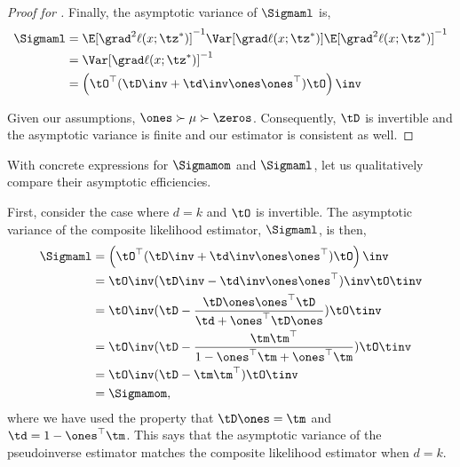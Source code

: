 \begin{proof}[Proof for ]
Finally, the asymptotic variance of $\Sigmaml$ is,
\begin{align*}
    \Sigmaml &= \E[\grad^2 \ell(x ; \tz^*)]^{-1} \Var[\grad \ell(x ; \tz^*)] \E[\grad^2 \ell(x ; \tz^*)]^{-1} \\
      &= \Var[\grad \ell(x;\tz^*)]^{-1} \\
      &= \left( \tO^\top(\tD\inv + \td\inv \ones \ones^\top) \tO \right)\inv
\end{align*}

Given our assumptions, $\ones \succ \mu \succ \zeros$. Consequently,
$\tD$ is invertible and the asymptotic variance is finite and our
estimator is consistent as well. 
\end{proof}

With concrete expressions for $\Sigmamom$ and $\Sigmaml$, let us
qualitatively compare their asymptotic efficiencies.

First, consider the case where $d=k$ and $\tO$ is invertible. The
asymptotic variance of the composite likelihood estimator, $\Sigmaml$,
is then,
\begin{align*}
    \Sigmaml 
      &= \left( \tO^\top(\tD\inv + \td\inv \ones \ones^\top) \tO \right)\inv \\
      &= \tO\inv (\tD\inv - \td\inv \ones \ones^\top)\inv \tO\tinv \\
      &= \tO\inv (\tD - \frac{\tD \ones \ones^\top \tD}{\td + \ones^\top \tD \ones}) \tO\tinv \\
      &= \tO\inv (\tD - \frac{\tm \tm^\top}{1 - \ones^\top \tm + \ones^\top \tm}) \tO\tinv \\
      &= \tO\inv (\tD - \tm \tm^\top) \tO\tinv \\
      &= \Sigmamom,
\end{align*}
where we have used the property that $\tD \ones = \tm$ and $\td
= 1 - \ones^\top \tm$.
This says that the asymptotic variance of the pseudoinverse estimator
matches the composite likelihood estimator when $d=k$.

